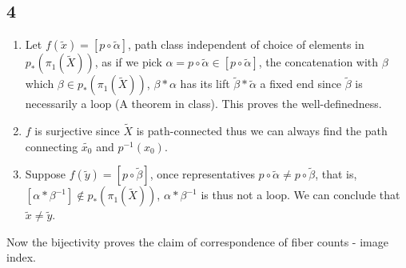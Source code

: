 \documentclass[11pt]{article}
\theoremstyle{remark}
\begin{document}
\subsection*{4}
\begin{enumerate}
    \item Let $f(\tilde{x})=[p\circ \tilde{\alpha}]$, path class independent of choice of elements in $p_*(\pi_1(\tilde{X})) $, as if we pick $\alpha=p\circ \tilde{\alpha} \in [p\circ \tilde{\alpha}]$, the concatenation with $\beta$ which $\beta \in p_*(\pi_1(\tilde{X})) $, $\beta*\alpha$ has its lift $\tilde{\beta}*\tilde{\alpha}$ a fixed end since $\tilde{\beta}$ is necessarily a loop (A theorem in class). This proves the well-definedness. 
    \item $f$ is surjective since $\tilde{X}$ is path-connected thus we can always find the path connecting $\tilde{x_0}$ and $p^{-1}(x_0)$.
    \item Suppose $f(\tilde{y})=[p\circ \tilde{\beta}]$, once representatives $p\circ \tilde{\alpha} \neq p\circ \tilde{\beta}$, that is, $[\alpha*\beta^{-1}] \not\in p_*(\pi_1(\tilde{X}))$, $\alpha*\beta^{-1}$ is thus not  a loop. We can conclude that $\tilde{x}\neq \tilde{y}$. 
\end{enumerate}
Now the bijectivity proves the claim of correspondence of fiber counts - image index.
\end{document}
